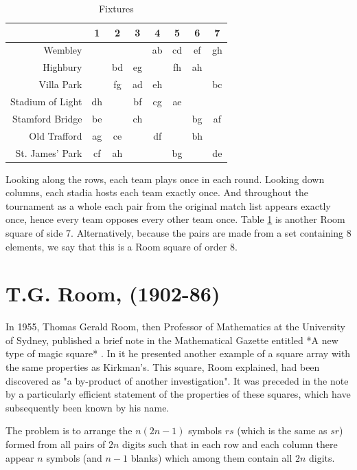 \documentclass[
  11pt,
  a4paper]{book}\usepackage[]{graphicx}\usepackage[]{xcolor}
\newcounter{example}
\begin{document}
\begin{table}[h!]
  \begin{center}
    \caption{Fixtures}
    \label{tab:fixtures}
    \begin{tabular}{r|ccccccc}
                       & 1  &  2 &  3 &  4 &  5 &  6 &  7 \\ \hline
               Wembley &    &    &    & ab & cd & ef & gh \\
              Highbury &    & bd & eg &    & fh & ah &    \\
            Villa Park &    & fg & ad & eh &    &    & bc \\
      Stadium of Light & dh &    & bf & cg & ae &    &    \\
       Stamford Bridge & be &    & ch &    &    & bg & af \\
          Old Trafford & ag & ce &    & df &    & bh &    \\
       St. James' Park & cf & ah &    &    & bg &    & de
    \end{tabular}
  \end{center}
\end{table}

Looking along the rows, each team plays once in each round.
Looking down columns, each stadia hosts each team exactly once.
And throughout the tournament as a whole each pair from the original match list appears exactly once, hence every team opposes every other team once.
Table \ref{tab:fixtures} is another Room square of side 7.
Alternatively, because the pairs are made from a set containing 8 elements, we say that this is a Room square of order 8.

\section{T.G. Room, (1902-86)}

In 1955, Thomas Gerald Room, then Professor of Mathematics at the University of Sydney, published a brief note in the Mathematical Gazette entitled *A new type of magic square* \cite{room2569NewType1955}.
In it he presented another example of a square array with the same properties as Kirkman’s.
This square, Room explained, had been discovered as "a by-product of another investigation".
It was preceded in the note by a particularly efficient statement of the properties of these squares, which have subsequently been known by his name.

The problem is to arrange the $n(2n-1)$ symbols $rs$ (which is the same as $sr$) formed from all pairs of $2n$ digits such that in each row and each column there appear $n$ symbols (and $n-1$ blanks) which among them contain all $2n$ digits.
\end{document}
